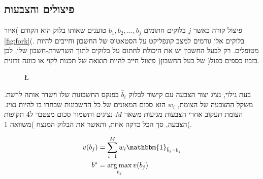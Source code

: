 \subsection{פיצולים והצבעות} \label{sec:forks}
פיצול קורה כאשר $j$ בלוקים חתומים $b_1, b_2, \dots, b_j$ טוענים שאותו בלוק הוא הקודם )איור \ref{fig:fork}(. בלוקים אלו גורמים למצב קונפליקט על הסטאטוס של החשבון וחייבים להיות מטופלים. רק לבעל החשבון יש את היכולת לחתום על בלוקים לתוך השרשרת-חשבון שלו, לכן פיצול חייב להיות תוצאה של תכנות לקוי או כוונה זדונית )בזבוז כספים כפול( של בעל החשבון.

\begin{figure}[!ht]
\L{
   \centering
   }
\end{figure}

בעת גילוי, נציג יצור הצבעה עם קישור לבלוק $\hat{b}_i$ בפנקס החשבונות שלו וישדר אותה לרשת. משקל ההצבעה של הצומת, $w_i$  הוא סכום המאזנים של כל החשבונות שבחרו בו להיות נציג. הצומת תעקוב אחרי הצבעות מגיעות משאר $M$  נציגים ותשמור סכום מצטבר ל4 תקופות הצבעה, סך הכל כדקה אחת, ותאשר את הבלוק המנצח )משוואה 1(.

\begin{align}
   v(b_j) &= \sum_{i=1}^M w_i\mathbbm{1}_{\hat{b}_i=b_j} \label{eq:weighted_vote} \\
   b^* &= \argmax_{b_j} v(b_j) \label{eq:most_votes}
\end{align}

